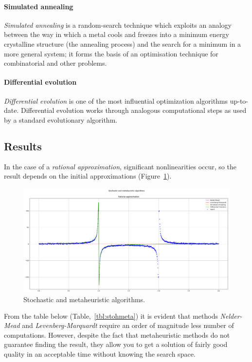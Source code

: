 \paragraph{Simulated annealing}
\textit{Simulated annealing} is a random-search technique which exploits an analogy between the way in  which a metal cools and freezes into a minimum energy crystalline structure (the annealing process) and  the search for a minimum in a more general system;
it forms the basis of an optimisation technique for combinatorial and other problems.

\paragraph{Differential evolution}
\textit{Differential evolution} is one of the most influential optimization algorithms up-to-date.
Differential evolution works through analogous computational steps as used by a standard evolutionary algorithm.

\subsection{Results}\label{subsec:results}

In the case of a \textit{rational approximation}, significant nonlinearities occur, so the result depends on the initial approximations (Figure~\ref{ris:plot}).

\begin{figure}[H]
    \center
    \includegraphics[width=\textwidth]{img/plot.png}
    \caption{Stochastic and metaheuristic algorithms.}
    \label{ris:plot}
\end{figure}

From the table below (Table,~\ref{tbl:stohmeta}) it is evident that methods \textit{Nelder-Mead} and \textit{Levenberg-Marquardt} require an order of magnitude less number of computations.
However, despite the fact that metaheuristic methods do not guarantee finding the result, they allow you to get a solution of fairly good quality in an acceptable time without knowing the search space.

